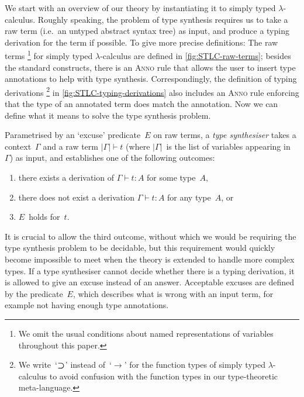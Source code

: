 We start with an overview of our theory by instantiating it to simply typed $\lambda$-calculus.
Roughly speaking, the problem of type synthesis requires us to take a raw term (i.e.~an untyped abstract syntax tree) as input, and produce a typing derivation for the term if possible.
To give more precise definitions:
The raw terms%
\footnote{We omit the usual conditions about named representations of variables throughout this paper.}
for simply typed $\lambda$-calculus are defined in \cref{fig:STLC-raw-terms};
besides the standard constructs, there is an \textsc{Anno} rule that allows the user to insert type annotations to help with type synthesis.
Correspondingly, the definition of typing derivations%
\footnote{We write~`$\mathbin{\bm{\supset}}$' instead of~`$\to$' for the function types of simply typed $\lambda$-calculus to avoid confusion with the function types in our type-theoretic meta-language.}
in \cref{fig:STLC-typing-derivations} also includes an \textsc{Anno} rule enforcing that the type of an annotated term does match the annotation.
Now we can define what it means to solve the type synthesis problem.

\begin{definition}
\label{def:STLC-type-synthesiser}
Parametrised by an `excuse' predicate~$E$ on raw terms, a \emph{type synthesiser} takes a context~$\Gamma$ and a raw term $|\Gamma| \vdash t$ (where $|\Gamma|$~is the list of variables appearing in~$\Gamma$) as input, and establishes one of the following outcomes:
\begin{enumerate}
\item there exists a derivation of $\Gamma \vdash t : A$ for some type~$A$,
\item there does not exist a derivation $\Gamma \vdash t : A$ for any type~$A$, or
\item $E$~holds for~$t$.
\end{enumerate}
\end{definition}

It is crucial to allow the third outcome, without which we would be requiring the type synthesis problem to be decidable, but this requirement would quickly become impossible to meet when the theory is extended to handle more complex types.
If a type synthesiser cannot decide whether there is a typing derivation, it is allowed to give an excuse instead of an answer.
Acceptable excuses are defined by the predicate~$E$, which describes what is wrong with an input term, for example not having enough type annotations.

